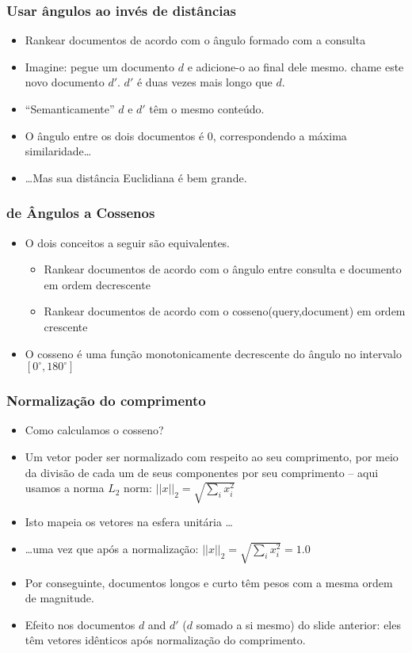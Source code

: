 \documentclass[compress]{beamer}
\def\myblue#1{\textcolor{texblue}{#1}}
\begin{document}
\begin{frame}[<+->]
\frametitle{Usar ângulos ao invés de distâncias}
\pause[2]
\begin{itemize}
\item Rankear documentos de acordo com o ângulo formado com a consulta
\item Imagine: pegue um documento $d$ e adicione-o ao final dele mesmo. chame este novo documento $d'$. $d'$ é duas vezes mais longo que $d$.
\item ``Semanticamente'' $d$ e $d'$ têm o mesmo conteúdo.
\item O ângulo entre os dois documentos é 0, correspondendo  a máxima similaridade\ldots
\item \ldots Mas sua distância Euclidiana é bem grande.
\end{itemize}
\end{frame}

\begin{frame}[<+->]
\frametitle{de Ângulos a Cossenos}
\pause[2]
\begin{itemize}
\item O dois conceitos a seguir são equivalentes.
\begin{itemize}
\item Rankear documentos de acordo com o \myblue{ângulo} entre consulta e documento em ordem  decrescente
\item Rankear documentos de acordo com o \myblue{cosseno}(query,document) em ordem crescente
\end{itemize}
\item O cosseno é uma função monotonicamente decrescente do ângulo no intervalo  $[0^\circ,180^\circ]$
\end{itemize}
\end{frame}


\begin{frame}[<+->]
\frametitle{Normalização do comprimento}
\pause[2]
\begin{itemize}
\item Como calculamos o cosseno?
\item Um vetor poder ser normalizado com respeito ao seu comprimento, por meio da divisão de cada um de seus componentes por seu comprimento -- aqui usamos a norma $L_2$
  norm: $||x||_2 = \sqrt{\sum_i x_i^2}$
\item Isto mapeia os vetores na esfera unitária \ldots
\item \ldots uma vez que após a normalização: 
  $||x||_2 = \sqrt{\sum_i x_i^2} = 1.0$
\item Por conseguinte, documentos longos e curto têm pesos com a mesma ordem de magnitude.
\item Efeito nos documentos $d$ and $d'$ ($d$ somado a si mesmo) do slide anterior: eles têm   \myblue{vetores idênticos} após normalização do comprimento.
\end{itemize}
\end{frame}
\end{document}
